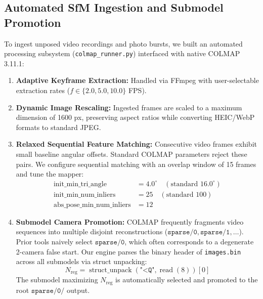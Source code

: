 \documentclass[conference]{IEEEtran}
\begin{document}
\subsection{Automated SfM Ingestion and Submodel Promotion}
To ingest unposed video recordings and photo bursts, we built an automated processing subsystem (\texttt{colmap\_runner.py}) interfaced with native COLMAP 3.11.1:
\begin{enumerate}
    \item \textbf{Adaptive Keyframe Extraction:} Handled via FFmpeg with user-selectable extraction rates ($f \in \{2.0, 5.0, 10.0\}$ FPS).
    \item \textbf{Dynamic Image Rescaling:} Ingested frames are scaled to a maximum dimension of 1600 px, preserving aspect ratios while converting HEIC/WebP formats to standard JPEG.
    \item \textbf{Relaxed Sequential Feature Matching:} Consecutive video frames exhibit small baseline angular offsets. Standard COLMAP parameters reject these pairs. We configure sequential matching with an overlap window of 15 frames and tune the mapper:
    \begin{align*}
    \text{init\_min\_tri\_angle} &= 4.0^\circ \quad (\text{standard } 16.0^\circ) \\
    \text{init\_min\_num\_inliers} &= 25 \quad (\text{standard } 100) \\
    \text{abs\_pose\_min\_num\_inliers} &= 12
    \end{align*}
    \item \textbf{Submodel Camera Promotion:} COLMAP frequently fragments video sequences into multiple disjoint reconstructions ($\texttt{sparse/0}, \texttt{sparse/1}, \dots$). Prior tools naively select $\texttt{sparse/0}$, which often corresponds to a degenerate 2-camera false start. Our engine parses the binary header of \texttt{images.bin} across all submodels via struct unpacking:
    \begin{equation}
    N_{\text{reg}} = \operatorname{struct\_unpack}(\texttt{"<Q"}, \operatorname{read}(8))[0]
    \end{equation}
    The submodel maximizing $N_{\text{reg}}$ is automatically selected and promoted to the root $\texttt{sparse/0/}$ output.
\end{enumerate}
\end{document}
